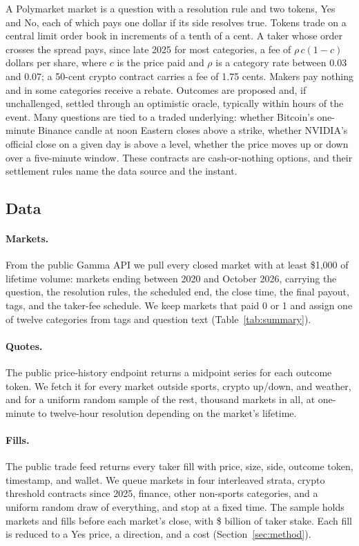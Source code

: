 \documentclass[format=acmsmall, review=false]{acmart}
\begin{document}
A Polymarket market is a question with a resolution rule and two tokens, Yes and No, each of which pays one dollar if its side resolves true. Tokens trade on a central limit order book in increments of a tenth of a cent. A taker whose order crosses the spread pays, since late 2025 for most categories, a fee of $\rho\,c(1-c)$ dollars per share, where $c$ is the price paid and $\rho$ is a category rate between 0.03 and 0.07; a 50-cent crypto contract carries a fee of 1.75 cents. Makers pay nothing and in some categories receive a rebate. Outcomes are proposed and, if unchallenged, settled through an optimistic oracle, typically within hours of the event. Many questions are tied to a traded underlying: whether Bitcoin's one-minute Binance candle at noon Eastern closes above a strike, whether NVIDIA's official close on a given day is above a level, whether the price moves up or down over a five-minute window. These contracts are cash-or-nothing options, and their settlement rules name the data source and the instant.

\subsection{Data}

\paragraph{Markets.} From the public Gamma API we pull every closed market with at least \$1,000 of lifetime volume: \nMarkets{} markets ending between 2020 and October 2026, carrying the question, the resolution rules, the scheduled end, the close time, the final payout, tags, and the taker-fee schedule. We keep markets that paid 0 or 1 and assign one of twelve categories from tags and question text (Table~\ref{tab:summary}).

\paragraph{Quotes.} The public price-history endpoint returns a midpoint series for each outcome token. We fetch it for every market outside sports, crypto up/down, and weather, and for a uniform random sample of the rest, \quoteMarketsK{} thousand markets in all, at one-minute to twelve-hour resolution depending on the market's lifetime.

\paragraph{Fills.} The public trade feed returns every taker fill with price, size, side, outcome token, timestamp, and wallet. We queue markets in four interleaved strata, crypto threshold contracts since 2025, finance, other non-sports categories, and a uniform random draw of everything, and stop at a fixed time. The sample holds \tapeMarkets{} markets and \tapeFills{} fills before each market's close, with \$\tapeUsdB{} billion of taker stake. Each fill is reduced to a Yes price, a direction, and a cost (Section~\ref{sec:method}).
\end{document}
